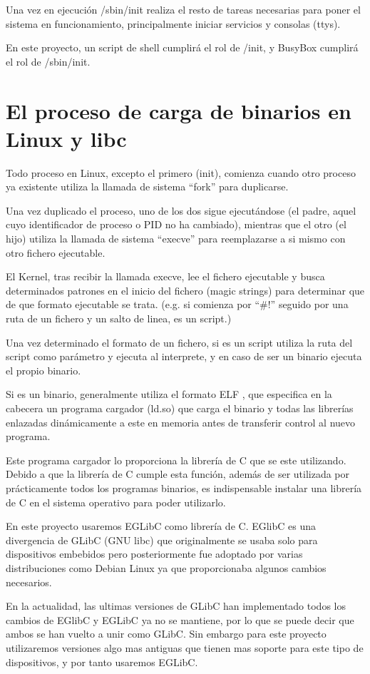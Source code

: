 \documentclass{tfg}
\begin{document}
Una vez en ejecución /sbin/init realiza el resto de tareas necesarias para poner el sistema en funcionamiento, principalmente iniciar servicios y consolas (ttys).

En este proyecto, un script de shell cumplirá el rol de /init, y BusyBox cumplirá el rol de /sbin/init.

\section{El proceso de carga de binarios en Linux y libc}
Todo proceso en Linux, excepto el primero (init), comienza cuando otro proceso ya existente utiliza la llamada de sistema ``fork'' para duplicarse.

Una vez duplicado el proceso, uno de los dos sigue ejecutándose (el padre, aquel cuyo identificador de proceso o PID no ha cambiado), mientras que el otro (el hijo) utiliza la llamada de sistema ``execve'' para reemplazarse a si mismo con otro fichero ejecutable.

El Kernel, tras recibir la llamada execve, lee el fichero ejecutable y busca determinados patrones en el inicio del fichero (magic strings) para determinar que de que formato ejecutable se trata. (e.g. si comienza por ``\#!'' seguido por una ruta de un fichero y un salto de linea, es un script.)

Una vez determinado el formato de un fichero, si es un script utiliza la ruta del script como parámetro y ejecuta al interprete, y en caso de ser un binario ejecuta el propio binario.

Si es un binario, generalmente utiliza el formato ELF \cite{elf}, que especifica en la cabecera un programa cargador (ld.so) que carga el binario y todas las librerías enlazadas dinámicamente a este en memoria antes de transferir control al nuevo programa.

Este programa cargador lo proporciona la librería de C que se este utilizando. Debido a que la librería de C cumple esta función, además de ser utilizada por prácticamente todos los programas binarios, es indispensable instalar una librería de C en el sistema operativo para poder utilizarlo.

En este proyecto usaremos EGLibC como librería de C. EGlibC es una divergencia de GLibC (GNU libc) que originalmente se usaba solo para dispositivos embebidos pero posteriormente fue adoptado por varias distribuciones como Debian Linux ya que proporcionaba algunos cambios necesarios.

En la actualidad, las ultimas versiones de GLibC han implementado todos los cambios de EGlibC y EGLibC ya no se mantiene, por lo que se puede decir que ambos se han vuelto a unir como GLibC. Sin embargo para este proyecto utilizaremos versiones algo mas antiguas que tienen mas soporte para este tipo de dispositivos, y por tanto usaremos EGLibC.
\end{document}
